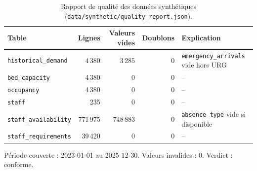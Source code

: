 \begin{table}[H]
    \centering
    \caption{Rapport de qualité des données synthétiques (\texttt{data/synthetic/quality\_report.json}).}
    \label{tab:qualite}
    \small
    \begin{tabular}{lrrrl}
        \toprule
        \textbf{Table} & \textbf{Lignes} & \textbf{Valeurs vides} & \textbf{Doublons} & \textbf{Explication} \\
        \midrule
        \texttt{historical\_demand} & 4\,380 & 3\,285 & 0 & \texttt{emergency\_arrivals} vide hors URG \\
        \texttt{bed\_capacity} & 4\,380 & 0 & 0 & -- \\
        \texttt{occupancy} & 4\,380 & 0 & 0 & -- \\
        \texttt{staff} & 235 & 0 & 0 & -- \\
        \texttt{staff\_availability} & 771\,975 & 748\,883 & 0 & \texttt{absence\_type} vide si disponible \\
        \texttt{staff\_requirements} & 39\,420 & 0 & 0 & -- \\
        \bottomrule
    \end{tabular}
    \par\vspace{3pt}
    {\footnotesize Période couverte : 2023-01-01 au 2025-12-30. Valeurs invalides : 0. Verdict : conforme.}
\end{table}
